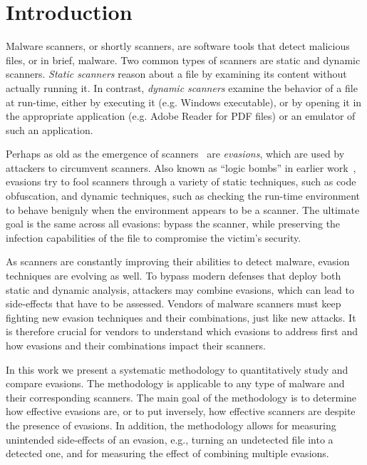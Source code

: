 \section{Introduction}

Malware scanners, or shortly scanners, are software tools that detect malicious files, or in brief, malware.
Two common types of scanners are static and dynamic scanners.
\emph{Static scanners} reason about a file by examining its content without actually running it.
In contrast, \emph{dynamic scanners} examine the behavior of a file at run-time, either by executing it (e.g. Windows executable), or by opening it in the appropriate application (e.g. Adobe Reader for PDF files) or an emulator of such an application.

Perhaps as old as the emergence of scanners~\cite{historyofevasion} are \emph{evasions}, which are used by attackers to circumvent scanners.
Also known as ``logic bombs'' in earlier work~\cite{greenberg1998mobile}, evasions try to fool scanners through a variety of static techniques, such as code obfuscation, and dynamic techniques, such as checking the run-time environment to behave benignly when the environment appears to be a scanner.
The ultimate goal is the same across all evasions: bypass the scanner, while preserving the infection capabilities of the file to compromise the victim's security.

As scanners are constantly improving their abilities to detect malware, evasion techniques are evolving as well. To bypass modern defenses that deploy both static and dynamic analysis, attackers may combine evasions, which can lead to side-effects that have to be assessed.
Vendors of malware scanners must keep fighting new evasion techniques and their combinations, just like new attacks.
It is therefore crucial for vendors to understand which evasions to address first and how evasions and their combinations impact their scanners.

In this work we present a systematic methodology to quantitatively study and compare evasions.
The methodology is applicable to any type of malware and their corresponding scanners.
The main goal of the methodology is to determine how effective evasions are, or to put inversely, how effective scanners are despite the presence of evasions.
In addition, the methodology allows for measuring unintended side-effects of an evasion, e.g., turning an undetected file into a detected one, and for measuring the effect of combining multiple evasions.

